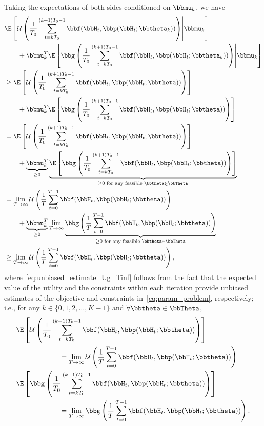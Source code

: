 Taking the expectations of both sides conditioned on $\bbmu_{k}$, we have
\begin{align}
&\E\left[\mathcal{U}\left( \frac{1}{T_0} \sum_{t=kT_0}^{(k+1)T_0-1} \bbf(\bbH_{t}, \bbp(\bbH_{t};\bbtheta_k)) \right)\middle| \bbmu_{k} \right]\nonumber \\
   &\qquad+ \bbmu_{k}^T \E\left[\bbg\left( \frac{1}{T_0} \sum_{t=kT_0}^{(k+1)T_0-1} \bbf(\bbH_{t}, \bbp(\bbH_{t};\bbtheta_k)) \right)\middle| \bbmu_{k} \right]\nonumber   \\
&\geq \E\left[\mathcal{U}\left( \frac{1}{T_0} \sum_{t=kT_0}^{(k+1)T_0-1} \bbf(\bbH_{t}, \bbp(\bbH_{t};\bbtheta)) \right)\right]\nonumber \\
   &\qquad+ \bbmu_{k}^T \E\left[\bbg\left( \frac{1}{T_0} \sum_{t=kT_0}^{(k+1)T_0-1} \bbf(\bbH_{t}, \bbp(\bbH_{t};\bbtheta)) \right)\right] \\
&= \E\left[\mathcal{U}\left( \frac{1}{T_0} \sum_{t=kT_0}^{(k+1)T_0-1} \bbf(\bbH_{t}, \bbp(\bbH_{t};\bbtheta)) \right)\right]\nonumber \\
   &\qquad+ \underbrace{\bbmu_{k}^T}_{\geq 0} \underbrace{\E\left[\bbg\left( \frac{1}{T_0} \sum_{t=kT_0}^{(k+1)T_0-1} \bbf(\bbH_{t}, \bbp(\bbH_{t};\bbtheta)) \right)\right]}_{\geq 0 \text{ for any feasible }\bbtheta\in\bbTheta}\label{eq:unbiased_estimate_prev_exp}\\
&= \lim_{T\to\infty} \mathcal{U}\left( \frac{1}{T} \sum_{t=0}^{T-1} \bbf(\bbH_t, \bbp(\bbH_t;\bbtheta)) \right)\nonumber \\
   &\qquad+ \underbrace{\bbmu_{k}^T}_{\geq 0} \lim_{T\to\infty} \underbrace{\bbg\left( \frac{1}{T} \sum_{t=0}^{T-1} \bbf(\bbH_t, \bbp(\bbH_t;\bbtheta)) \right)}_{\geq 0 \text{ for any feasible }\bbtheta\in\bbTheta}\label{eq:unbiased_estimate_Ug_Tinf}\\
& \geq \lim_{T\to\infty} \mathcal{U}\left( \frac{1}{T} \sum_{t=0}^{T-1} \bbf(\bbH_t, \bbp(\bbH_t;\bbtheta)) \right), \label{eq:objective_RHS}
\end{align}
where~\eqref{eq:unbiased_estimate_Ug_Tinf} follows from the fact that the expected value of the utility and the constraints within each iteration provide unbiased estimates of the objective and constraints in~\eqref{eq:param_problem}, respectively; i.e., for any $k\in\{0,1,2,\dots,K-1\}$ and $\forall \bbtheta \in \bbTheta$,
\begin{align}
&\E\left[\mathcal{U}\left( \frac{1}{T_0} \sum_{t=kT_0}^{(k+1)T_0-1} \bbf(\bbH_{t}, \bbp(\bbH_{t};\bbtheta)) \right)\right] \nonumber \\
&\qquad\qquad\qquad = \lim_{T\to\infty}\mathcal{U}\left( \frac{1}{T} \sum_{t=0}^{T-1} \bbf(\bbH_t, \bbp(\bbH_t;\bbtheta)) \right) \\
&\E\left[\bbg\left( \frac{1}{T_0} \sum_{t=kT_0}^{(k+1)T_0-1} \bbf(\bbH_{t}, \bbp(\bbH_{t};\bbtheta)) \right)\right] \nonumber \\
&\qquad\qquad\qquad = \lim_{T\to\infty}\bbg\left( \frac{1}{T} \sum_{t=0}^{T-1} \bbf(\bbH_t, \bbp(\bbH_t;\bbtheta)) \right).
\end{align}
